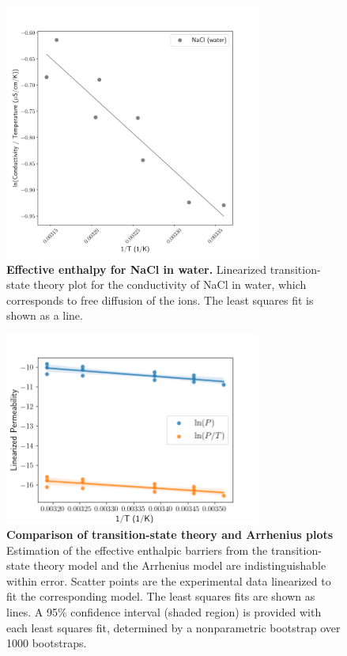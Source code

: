 \begin{figure}[ht!]
    \centering
    \includegraphics[width=0.75\textwidth]{figures/NaCl_in_water_TST.png}
    \caption{\textbf{Effective enthalpy for NaCl in water.} Linearized transition-state theory plot for the conductivity of NaCl in water, which corresponds to free diffusion of the ions. The least squares fit is shown as a line.}
    \label{fig:tst_NaCl_water}
\end{figure}

\clearpage
\pagebreak

\begin{figure}[ht!]
    \centering
    \includegraphics[width=0.75\textwidth]{figures/TST_vs_Arrhenius_plots.png}
    \caption{\textbf{Comparison of transition-state theory and Arrhenius plots} Estimation of the effective enthalpic barriers from the transition-state theory model and the Arrhenius model are indistinguishable within error. Scatter points are the experimental data linearized to fit the corresponding model. The least squares fits are shown as lines. A 95\% confidence interval (shaded region) is provided with each least squares fit, determined by a nonparametric bootstrap over 1000 bootstraps.}
    \label{fig:arrhenius_vs_tst}
\end{figure}

